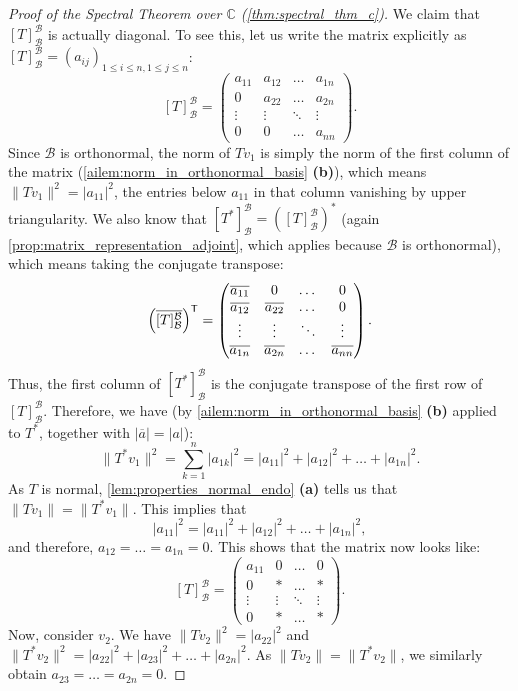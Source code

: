 \begin{proof}[Proof of the Spectral Theorem over $\mathbb{C}$ (\cref{thm:spectral_thm_c})]
We claim that $[T]_{\mathcal{B}}^{\mathcal{B}}$ is actually diagonal. To see this, let us write the matrix explicitly as $[T]_{\mathcal{B}}^{\mathcal{B}} = (a_{ij})_{1 \leq i \leq n, 1 \leq j \leq n}$:
\[
    [T]_{\mathcal{B}}^{\mathcal{B}} = 
    \begin{pmatrix}
        a_{11} & a_{12} & \dots & a_{1n} \\
        0 & a_{22} & \dots & a_{2n} \\
        \vdots & \vdots & \ddots & \vdots \\
        0 & 0 & \dots & a_{nn}
    \end{pmatrix}.
\]
Since $\mathcal{B}$ is orthonormal, the norm of $Tv_1$ is simply the norm of the first column of the matrix (\cref{ailem:norm_in_orthonormal_basis} \textbf{(b)}), which means $\|Tv_1\|^2 = |a_{11}|^2$, the entries below $a_{11}$ in that column vanishing by upper triangularity.
We also know that $[T^*]_{\mathcal{B}}^{\mathcal{B}} = \left([T]_{\mathcal{B}}^{\mathcal{B}}\right)^*$ (again \cref{prop:matrix_representation_adjoint}, which applies because $\mathcal{B}$ is orthonormal), which means taking the conjugate transpose:
\[
    \left( \overline{[T]_{\mathcal{B}}^{\mathcal{B}}} \right)^{\mathsf{T}} = 
    \begin{pmatrix}
        \overline{a_{11}} & 0 & \dots & 0 \\
        \overline{a_{12}} & \overline{a_{22}} & \dots & 0 \\
        \vdots & \vdots & \ddots & \vdots \\
        \overline{a_{1n}} & \overline{a_{2n}} & \dots & \overline{a_{nn}}
    \end{pmatrix}.
\]
Thus, the first column of $[T^*]_{\mathcal{B}}^{\mathcal{B}}$ is the conjugate transpose of the first row of $[T]_{\mathcal{B}}^{\mathcal{B}}$. Therefore, we have (by \cref{ailem:norm_in_orthonormal_basis} \textbf{(b)} applied to $T^*$, together with $|\overline{a}| = |a|$):
\[
    \|T^*v_1\|^2 = \sum_{k=1}^n |a_{1k}|^2 = |a_{11}|^2 + |a_{12}|^2 + \dots + |a_{1n}|^2.
\]
As $T$ is normal, \cref{lem:properties_normal_endo} \textbf{(a)} tells us that $\|Tv_1\| = \|T^*v_1\|$. This implies that
\[
    |a_{11}|^2 = |a_{11}|^2 + |a_{12}|^2 + \dots + |a_{1n}|^2,
\]
and therefore, $a_{12} = \dots = a_{1n} = 0$. 
This shows that the matrix now looks like:
\[
    [T]_{\mathcal{B}}^{\mathcal{B}} = 
    \begin{pmatrix}
        a_{11} & 0 & \dots & 0 \\
        0 & * & \dots & * \\
        \vdots & \vdots & \ddots & \vdots \\
        0 & * & \dots & *
    \end{pmatrix}.
\]
Now, consider $v_2$. We have $\|Tv_2\|^2 = |a_{22}|^2$ and $\|T^*v_2\|^2 = |a_{22}|^2 + |a_{23}|^2 + \dots + |a_{2n}|^2$. 
As $\|Tv_2\| = \|T^*v_2\|$, we similarly obtain $a_{23} = \dots = a_{2n} = 0$. 


\end{proof}
